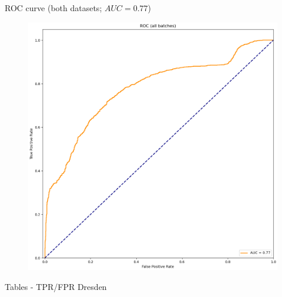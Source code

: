 \begin{frame}{ROC curve (both datasets; $AUC = 0.77$)}
    \vspace{-1.6em}
    \begin{figure}
        \centering
        \includegraphics[height=.8\textheight]{../drawable/results/roc-bulk__7700-all-both.png}
    \end{figure}
\end{frame}

\begin{frame}{Tables - TPR/FPR Dresden}
    \vspace{-1em}
    \begin{figure}
        \centering
    \end{figure}
\end{frame}


